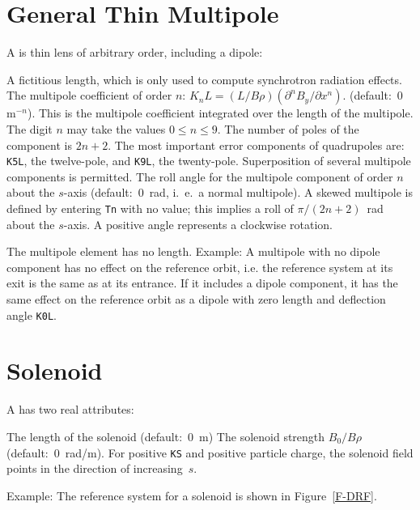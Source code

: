 \section{General Thin Multipole}
\label{S-MULT}
A  is thin lens of arbitrary order, including a dipole:
\begin{mylist}
A fictitious length, which is only used to compute synchrotron
radiation effects.
The multipole coefficient of order \(n\):
\(K_{n}L=(L/B\rho) (\partial^{n} B_{y}/\partial x^{n})\).
(default:~0~\(\mathrm{m}^{-n}\)).
This is the multipole coefficient integrated over the length
of the multipole.
The digit \(n\) may take the values \(0\leq n\leq 9\).
The number of poles of the component is \(2n+2\).
The most important error components of quadrupoles are:
{\tt K5L}, the twelve-pole, and {\tt K9L}, the twenty-pole.
Superposition of several multipole components is permitted.
The roll angle for the multipole component of order \(n\)
about the \(s\)-axis
(default:~0~rad, i.~e.~a normal multipole).
A skewed multipole is defined by entering {\tt Tn} with no value;
this implies a roll of \(\pi/(2n + 2)\)~rad about the \(s\)-axis.
A positive angle represents a clockwise rotation.
\end{mylist}
The multipole element has no length.
Example:
A multipole with no dipole component has no effect on the reference
orbit,
i.e. the reference system at its exit is the same as at its entrance.
If it includes a dipole component,
it has the same effect on the reference orbit as a dipole
with zero length and deflection angle {\tt K0L}.
 
\section{Solenoid}
\label{S-SOLO}
A  has two real attributes:
\begin{mylist}
The length of the solenoid (default:~0~m)
The solenoid strength \(B_0 / B \rho\)
(default:~0~rad/m).
For positive {\tt KS} and positive particle charge,
the solenoid field points in the direction of increasing~\(s\).
\end{mylist}
Example:
The reference system for a solenoid is shown in Figure~\ref{F-DRF}.
 
